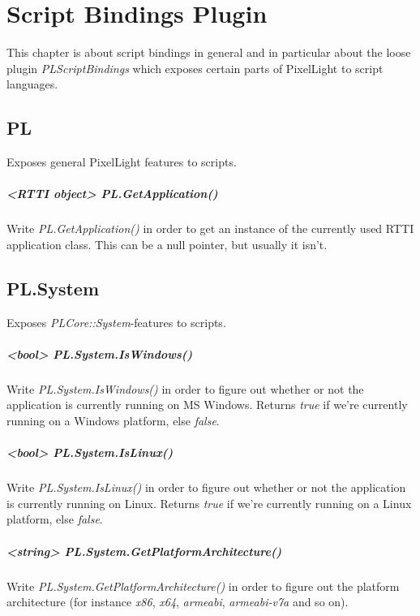 \chapter{Script Bindings Plugin}
\label{ScriptBindingsPlugin}
This chapter is about script bindings in general and in particular about the loose plugin \emph{PLScriptBindings} which exposes certain parts of PixelLight to script languages.




\section{PL}
Exposes general PixelLight features to scripts.

\paragraph{<RTTI object> PL.GetApplication()}
Write \emph{PL.GetApplication()} in order to get an instance of the currently used \ac{RTTI} application class. This can be a null pointer, but usually it isn't.




\section{PL.System}
Exposes \emph{PLCore::System}-features to scripts.

\paragraph{<bool> PL.System.IsWindows()}
Write \emph{PL.System.IsWindows()} in order to figure out whether or not the application is currently running on \ac{MS} Windows. Returns \emph{true} if we're currently running on a Windows platform, else \emph{false}.

\paragraph{<bool> PL.System.IsLinux()}
Write \emph{PL.System.IsLinux()} in order to figure out whether or not the application is currently running on Linux. Returns \emph{true} if we're currently running on a Linux platform, else \emph{false}.

\paragraph{<string> PL.System.GetPlatformArchitecture()}
Write \emph{PL.System.GetPlatformArchitecture()} in order to figure out the platform architecture (for instance \emph{x86}, \emph{x64}, \emph{armeabi}, \emph{armeabi-v7a} and so on).




